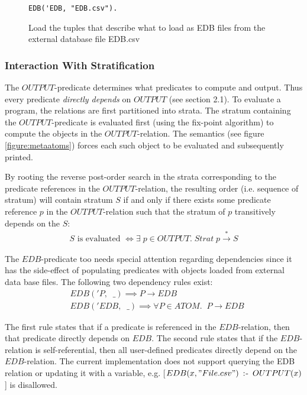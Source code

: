 \vspace*{-\baselineskip}
\begin{figure}[!ht]
\begin{minipage}{4cm}
\begin{verbatim}
EDB('EDB, "EDB.csv"). 
\end{verbatim}
\end{minipage}
\vspace*{-10pt}
\caption{Load the tuples that describe what to load as EDB files from the external database file EDB.csv}
\label{figure:edb}
\end{figure}

\subsubsection{Interaction With Stratification}
The $OUTPUT$-predicate determines what predicates to compute and output. Thus every predicate \textit{directly depends} on $OUTPUT$ (see section 2.1). To evaluate a \datalogM program, the relations are first partitioned into strata. The stratum containing the $OUTPUT$-predicate is evaluated first (using the fix-point algorithm) to compute the objects in the $OUTPUT$-relation. The semantics (see figure \ref{figure:metaatoms}) forces each such object to be evaluated and subsequently printed. 

By rooting the reverse post-order search in the strata corresponding to the predicate references in the $OUTPUT$-relation, the resulting order (i.e. sequence of stratum) will contain stratum $S$ if and only if there exists some predicate reference $p$ in the $OUTPUT$-relation such that the stratum of $p$ transitively depends on the $S$:
\begin{align*}
S \text{ is evaluated } \iff \exists\;p \in OUTPUT.\;Strat\;p \xrightarrow{*} S
\end{align*}

The $EDB$-predicate too needs special attention regarding dependencies since it has the side-effect of populating predicates with objects loaded from external data base files. The following two dependency rules exist:
\begin{align*}
&EDB('P,\;\; \_) \implies P \xrightarrow{} EDB\\
&EDB('EDB,\;\; \_) \implies \forall P \in ATOM. \;\;P \xrightarrow{} EDB
\end{align*}

The first rule states that if a predicate is referenced in the $EDB$-relation, then that predicate directly depends on $EDB$. The second rule states that if the $EDB$-relation is self-referential, then all user-defined predicates directly depend on the $EDB$-relation. The current implementation does not support querying the EDB relation or updating it with a variable, e.g. [$EDB(x, "File.csv") \;\mathbin{:\hspace{-0.5ex}\textsf{-}}\; OUTPUT(x)$] is disallowed.


